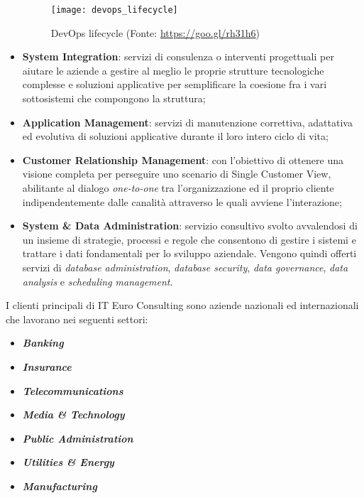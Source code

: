 \begin{itemize}
	\begin{figure}[!h] 
		\centering 
		\texttt{[image: devops\_lifecycle]} 
		\caption{DevOps lifecycle (Fonte: \href{https://goo.gl/rh31h6}{https://goo.gl/rh31h6})}
	\end{figure}
	\newpage
	\item \textbf{System Integration}: servizi di consulenza o interventi progettuali per aiutare le aziende a gestire al meglio le proprie strutture tecnologiche complesse e soluzioni applicative per semplificare la coesione fra i vari sottosistemi che compongono la struttura;
	\item \textbf{Application Management}: servizi di manutenzione correttiva, adattativa ed evolutiva di soluzioni applicative durante il loro intero ciclo di vita;
	\item \textbf{Customer Relationship Management}: con l'obiettivo di ottenere una visione completa per perseguire uno scenario di \gls{Single Customer View}, abilitante al dialogo \textit{one-to-one} tra l'organizzazione ed il proprio cliente indipendentemente dalle canalità attraverso le quali avviene l'interazione;
	\item \textbf{System \& Data Administration}: servizio consultivo svolto avvalendosi di un insieme di strategie, processi e regole che consentono di gestire i sistemi e trattare i dati fondamentali per lo sviluppo aziendale. Vengono quindi offerti servizi di \textit{database administration}, \textit{database security}, \textit{data governance}, \textit{data analysis} e \textit{scheduling management}.
\end{itemize}

I clienti principali di IT Euro Consulting sono aziende nazionali ed internazionali che lavorano nei seguenti settori:
\begin{itemize}
	\item \textit{\textbf{Banking}}
	\item \textit{\textbf{Insurance}}
	\item \textit{\textbf{Telecommunications}}
	\item \textit{\textbf{Media \& Technology}}
	\item \textit{\textbf{Public Administration}}
	\item \textit{\textbf{Utilities \& Energy}}
	\item \textit{\textbf{Manufacturing}}
\end{itemize}

